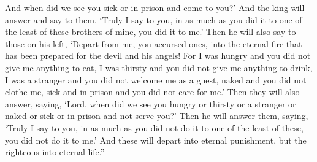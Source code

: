 \begin{biblechapter}
\verse And when did we see you sick or in prison and come to you?’
\verse And the king will answer and say to them, ‘Truly I say to you, in as much as you did it to one of the least of these brothers of mine, you did it to me.’
\verse Then he will also say to those on his left, ‘Depart from me, you accursed ones, into the eternal fire that has been prepared for the devil and his angels!
\verse For I was hungry and you did not give me anything to eat, I was thirsty and you did not give me anything to drink,
\verse I was a stranger and you did not welcome me as a guest, naked and you did not clothe me, sick and in prison and you did not care for me.’
\verse Then they will also answer, saying, ‘Lord, when did we see you hungry or thirsty or a stranger or naked or sick or in prison and not serve you?’
\verse Then he will answer them, saying, ‘Truly I say to you, in as much as you did not do it to one of the least of these, you did not do it to me.’
\verse And these will depart into eternal punishment, but the righteous into eternal life.”
\end{biblechapter}

